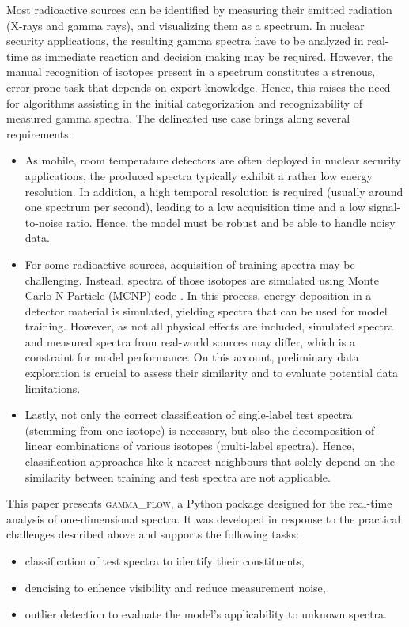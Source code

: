 \documentclass[review, 12pt, a4paper]{elsarticle}
\begin{document}
Most radioactive sources can be identified by measuring their emitted radiation (X-rays and gamma rays), and visualizing them as a spectrum. In nuclear security applications, the resulting gamma spectra have to be analyzed in real-time as immediate reaction and decision making may be required. 
However, the manual recognition of isotopes present in a spectrum constitutes a 
strenous, error-prone task that depends on expert knowledge. Hence, this raises 
the need for algorithms assisting in the initial categorization and recognizability 
of measured gamma spectra. 
The delineated use case brings along several requirements:  
\begin{itemize}
\item As mobile, room temperature detectors are often deployed in nuclear security applications, the produced spectra typically exhibit a rather low energy resolution. In addition, a high temporal resolution is required (usually around one spectrum per second), leading to a low acquisition time and a low signal-to-noise ratio. Hence, the model must be robust and be able to handle noisy data.  
\item For some radioactive sources, acquisition of training spectra may be challenging. Instead, spectra of those isotopes are simulated using Monte Carlo N-Particle (MCNP) code \cite{Kulesza2022}. In this process, energy deposition in a detector material is simulated, yielding spectra that can be used for model training. However, as not all physical effects are included, simulated spectra and measured spectra from real-world sources may differ, which is a constraint for model performance. On this account, preliminary data exploration is crucial to assess their similarity and to evaluate potential data limitations.
\item Lastly, not only the correct classification of single-label test spectra (stemming from one isotope) is necessary, but also the decomposition of linear combinations of various isotopes (multi-label spectra). Hence, classification approaches like k-nearest-neighbours that solely depend on the similarity between training and test spectra are not applicable.  
\end{itemize} 
This paper presents \textsc{gamma\_flow}, a Python package designed for the real-time analysis of one-dimensional spectra. It was developed in response to the practical challenges described above and supports the following tasks:
\begin{itemize}
\item classification of test spectra to identify their constituents,  
\item denoising to enhence visibility and reduce measurement noise,
\item outlier detection to evaluate the model's applicability to unknown spectra.   
\end{itemize}
\end{document}
